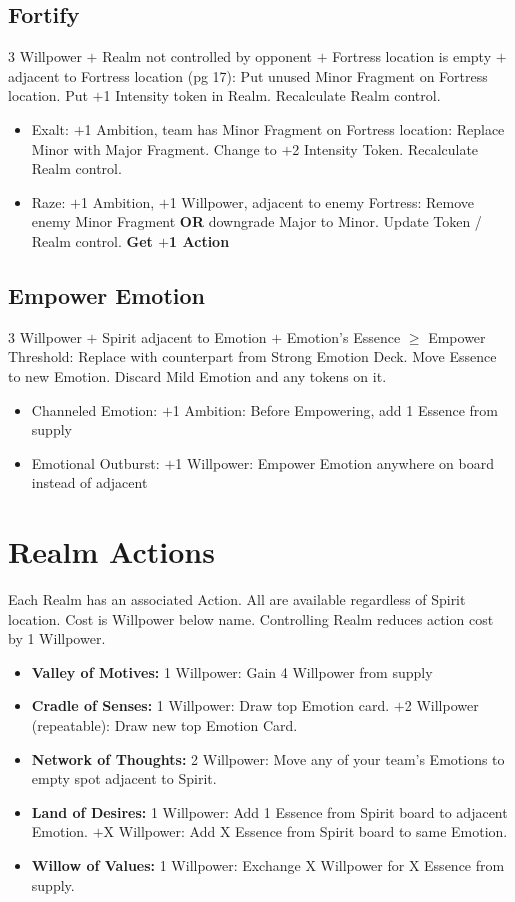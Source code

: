 \documentclass[10pt]{article}
\newenvironment{itemizeCustom}
{\begin{itemize}
  \setlength{\itemsep}{1pt}
  \setlength{\parskip}{0pt}
  \setlength{\parsep}{0pt}}
{\end{itemize}}
\begin{document}
\begin{multicols*}{2}
\subsection*{Fortify}
3 Willpower $+$ Realm not controlled by opponent $+$ Fortress location is empty $+$ adjacent to Fortress location (pg 17): Put unused Minor Fragment on Fortress location. Put $+$1 Intensity token in Realm. Recalculate Realm control.
\begin{itemizeCustom}
    \item Exalt: $+$1 Ambition, team has Minor Fragment on Fortress location: Replace Minor with Major Fragment. Change to $+$2 Intensity Token. Recalculate Realm control.
    \item Raze: $+$1 Ambition, $+$1 Willpower, adjacent to enemy Fortress: Remove enemy Minor Fragment \textbf{OR} downgrade Major to Minor. Update Token / Realm control. \textbf{Get $+$1 Action}
\end{itemizeCustom}

\subsection*{Empower Emotion}
3 Willpower $+$ Spirit adjacent to Emotion $+$ Emotion's Essence $\ge$ Empower Threshold: Replace with counterpart from Strong Emotion Deck. Move Essence to new Emotion. Discard Mild Emotion and any tokens on it.
\begin{itemizeCustom}
    \item Channeled Emotion: $+$1 Ambition: Before Empowering, add 1 Essence from supply
    \item Emotional Outburst: $+$1 Willpower: Empower Emotion anywhere on board instead of adjacent
\end{itemizeCustom}

\section*{Realm Actions}
Each Realm has an associated Action. All are available regardless of Spirit location. Cost is Willpower below name. Controlling  Realm reduces action cost by 1 Willpower.

\begin{itemizeCustom}
    \item \textbf{Valley of Motives:} 1 Willpower: Gain 4 Willpower from supply
    \item \textbf{Cradle of Senses:} 1 Willpower: Draw top Emotion card. $+$2 Willpower (repeatable): Draw new top Emotion Card.
    \item \textbf{Network of Thoughts:} 2 Willpower: Move any of your team's Emotions to empty spot adjacent to Spirit.
    \item \textbf{Land of Desires:} 1 Willpower: Add 1 Essence from Spirit board to adjacent Emotion. $+$X Willpower: Add X Essence from Spirit board to same Emotion.
    \item \textbf{Willow of Values:} 1 Willpower: Exchange X Willpower for X Essence from supply.
\end{itemizeCustom}


\end{multicols*}
\end{document}

